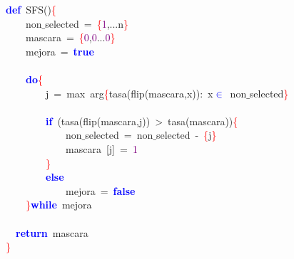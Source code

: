 \noindent
\mbox{}\textbf{\textcolor{Blue}{def}}\ SFS\textcolor{BrickRed}{()}\textcolor{Red}{\{} \\
\mbox{}\ \ \ \ non$\_$selected\ \textcolor{BrickRed}{=}\ \textcolor{Red}{\{}\textcolor{Purple}{1}\textcolor{BrickRed}{,...}n\textcolor{Red}{\}} \\
\mbox{}\ \ \ \ mascara\ \textcolor{BrickRed}{=}\ \textcolor{Red}{\{}\textcolor{Purple}{0}\textcolor{BrickRed}{,}\textcolor{Purple}{0}\textcolor{BrickRed}{...}\textcolor{Purple}{0}\textcolor{Red}{\}} \\
\mbox{}\ \ \ \ mejora\ \textcolor{BrickRed}{=}\ \textbf{\textcolor{Blue}{true}} \\
\mbox{} \\
\mbox{}\ \ \ \ \textbf{\textcolor{Blue}{do}}\textcolor{Red}{\{} \\
\mbox{}\ \ \ \ \ \ \ \ j\ \textcolor{BrickRed}{=}\ max\ arg\textcolor{Red}{\{}tasa\textcolor{BrickRed}{(}flip\textcolor{BrickRed}{(}mascara\textcolor{BrickRed}{,}x\textcolor{BrickRed}{)):}\ x\textcolor{BrickRed}{\quad}\textbf{\textcolor{Blue}{$\in$}}\ non$\_$selected\textcolor{Red}{\}} \\
\mbox{} \\
\mbox{}\ \ \ \ \ \ \ \ \textbf{\textcolor{Blue}{if}}\ \textcolor{BrickRed}{(}tasa\textcolor{BrickRed}{(}flip\textcolor{BrickRed}{(}mascara\textcolor{BrickRed}{,}j\textcolor{BrickRed}{))}\ \textcolor{BrickRed}{\textgreater{}}\ tasa\textcolor{BrickRed}{(}mascara\textcolor{BrickRed}{))}\textcolor{Red}{\{} \\
\mbox{}\ \ \ \ \ \ \ \ \ \ \ \ non$\_$selected\ \textcolor{BrickRed}{=}\ non$\_$selected\ \textcolor{BrickRed}{-}\ \textcolor{Red}{\{}j\textcolor{Red}{\}} \\
\mbox{}\ \ \ \ \ \ \ \ \ \ \ \ mascara\ \textcolor{BrickRed}{[}j\textcolor{BrickRed}{]}\ \textcolor{BrickRed}{=}\ \textcolor{Purple}{1} \\
\mbox{}\ \ \ \ \ \ \ \ \textcolor{Red}{\}} \\
\mbox{}\ \ \ \ \ \ \ \ \textbf{\textcolor{Blue}{else}} \\
\mbox{}\ \ \ \ \ \ \ \ \ \ \ \ mejora\ \textcolor{BrickRed}{=}\ \textbf{\textcolor{Blue}{false}} \\
\mbox{}\ \ \ \ \textcolor{Red}{\}}\textbf{\textcolor{Blue}{while}}\ mejora \\
\mbox{} \\
\mbox{}\ \ \textbf{\textcolor{Blue}{return}}\ mascara \\
\mbox{}\textcolor{Red}{\}} \\
\mbox{}
